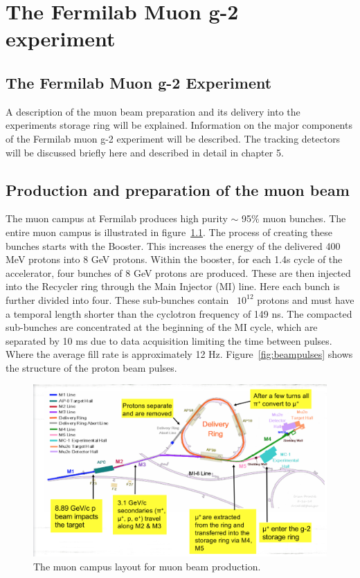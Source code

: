 
\chapter{The Fermilab Muon g-2 experiment} %

\label{Chapter3} %

\section{The Fermilab Muon g-2 Experiment}

A description of the muon beam preparation and its delivery into the experiments storage ring will be explained. Information on the major components of the Fermilab muon g-2 experiment will be described. The tracking detectors will be discussed briefly here and described in detail in chapter 5.

\section{Production and preparation of the muon beam}

The muon campus at Fermilab produces high purity $\sim$ 95$\%$ muon bunches. The entire muon campus is illustrated in figure~\ref{fig:muonbeamproduction}. The process of creating these bunches starts with the Booster. This increases the energy of the delivered 400 MeV protons into 8 GeV protons. Within the booster, for each 1.4s cycle of the accelerator, four bunches of 8 GeV protons are produced. These are then injected into the Recycler ring through the Main Injector (MI) line. Here each bunch is further divided into four. These sub-bunches contain ~$10^{12}$ protons and must have a temporal length shorter than the cyclotron frequency of 149 ns. The compacted sub-bunches are concentrated at the beginning of the MI cycle, which are separated by 10 ms due to data acquisition limiting the time between pulses. Where the average fill rate is approximately 12 Hz. Figure~\ref{fig:beampulses} shows the structure of the proton beam pulses.

\begin{figure}[th]
\centering
\includegraphics[scale=0.45]{Figures/muonbeamproduction}
\decoRule
\caption{The muon campus layout for muon beam production.}
\label{fig:muonbeamproduction}
\end{figure}

